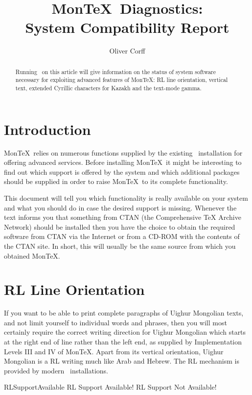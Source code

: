 \documentclass[a4paper,11pt]{article}
\title{Mon\TeX\ Diagnostics:\\
	System Compatibility Report}
\author{Oliver Corff}
\begin{document}
\maketitle
\begin{abstract}
	Running \LaTeXe\ on this article will give information
	on the status of system software necessary for exploiting
	advanced features of Mon\TeX: RL line orientation, vertical
	text, extended Cyrillic characters for Kazakh and the
	text-mode gamma.
\end{abstract}

\section{Introduction}

Mon\TeX\ relies on numerous functions supplied by the existing
\LaTeXe\ installation for offering advanced services. Before installing
Mon\TeX\ it might be interesting to find out which support is offered
by the system and which additional packages should be supplied in order
to raise Mon\TeX\ to its complete functionality.

This document will tell you which functionality is really available on
your system and
what you should do in case the desired support is missing. Whenever the
text informs you that something from CTAN (the Comprehensive TeX Archive
Network) should be installed then you have the choice to obtain the
required software from CTAN via the Internet or from a CD-ROM with the 
contents of the CTAN site. In short, this will usually be the same source
from which you obtained Mon\TeX.


\section{RL Line Orientation\label{RLSupport}}

If you want to be able to print complete paragraphs of Uighur Mongolian 
texts, and not limit yourself to individual words and phrases, then you
will most certainly require the correct writing direction for Uighur 
Mongolian which starts at the right end of line rather than the left end,
as supplied by Implementation Levels III and IV of Mon\TeX.
Apart from its vertical orientation, Uighur Mongolian is a RL writing
much like Arab and Hebrew. The RL mechanism is provided by modern
\LaTeXe\ installations.

\TokenDiagnostics%
	{\TeXXeTstate}				%
	{RLSupportAvailable}			%
	{RL Support Available!}			%
	{RL Support Not Available!}		%
\end{document}
